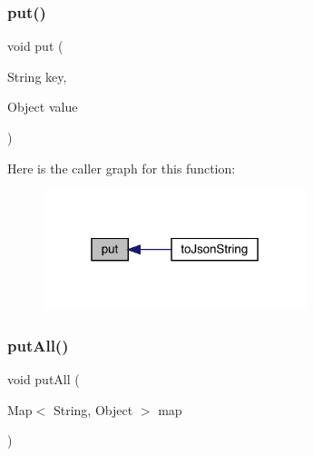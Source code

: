 \subsubsection{\texorpdfstring{put()}{put()}}
{\footnotesize\ttfamily void put (\begin{DoxyParamCaption}\item[{String}]{key,  }\item[{Object}]{value }\end{DoxyParamCaption})}

Here is the caller graph for this function\+:
\nopagebreak
\begin{figure}[H]
\begin{center}
\leavevmode
\includegraphics[width=217pt]{classcom_1_1toast_1_1android_1_1gamebase_1_1base_1_1auth_1_1_auth_provider_profile_a6eb563ccccdd77bf6fce2ef9f486944f_icgraph}
\end{center}
\end{figure}
\mbox{\label{classcom_1_1toast_1_1android_1_1gamebase_1_1base_1_1auth_1_1_auth_provider_profile_a720237025269aa7234a6c8644c9bba52}} 
\subsubsection{\texorpdfstring{put\+All()}{putAll()}}
{\footnotesize\ttfamily void put\+All (\begin{DoxyParamCaption}\item[{Map$<$ String, Object $>$}]{map }\end{DoxyParamCaption})}

